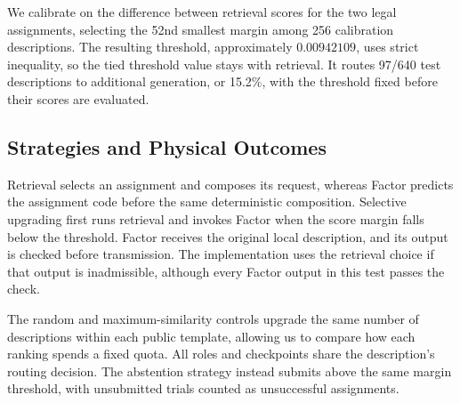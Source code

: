 \documentclass[sigconf,nonacm,balance=false]{aamas}
\begin{document}
We calibrate on the difference between retrieval scores for the two legal assignments, selecting the 52nd smallest margin among 256 calibration descriptions. The resulting threshold, approximately $0.00942109$, uses strict inequality, so the tied threshold value stays with retrieval. It routes 97/640 test descriptions to additional generation, or 15.2\%, with the threshold fixed before their scores are evaluated.

\subsection{Strategies and Physical Outcomes}
Retrieval selects an assignment and composes its request, whereas Factor predicts the assignment code before the same deterministic composition. Selective upgrading first runs retrieval and invokes Factor when the score margin falls below the threshold. Factor receives the original local description, and its output is checked before transmission. The implementation uses the retrieval choice if that output is inadmissible, although every Factor output in this test passes the check.

The random and maximum-similarity controls upgrade the same number of descriptions within each public template, allowing us to compare how each ranking spends a fixed quota. All roles and checkpoints share the description's routing decision. The abstention strategy instead submits above the same margin threshold, with unsubmitted trials counted as unsuccessful assignments.
\end{document}
